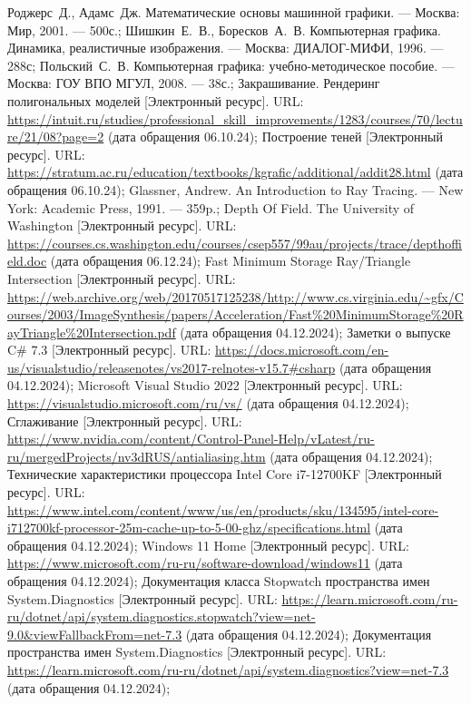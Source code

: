 \begin{thebibliography}{}
	 Роджерс~Д., Адамс~Дж. Математические основы машинной графики. --- Москва: Мир, 2001. --- 500с.;
	 Шишкин~Е.~В., Боресков~А.~В. Компьютерная графика. Динамика, реалистичные изображения. --- Москва: ДИАЛОГ-МИФИ, 1996. --- 288с;
	 Польский~С.~В. Компьютерная графика: учебно-методическое пособие. --- Москва: ГОУ ВПО МГУЛ, 2008. --- 38с.;
	 Закрашивание. Рендеринг полигональных моделей [Электронный ресурс]. URL: \url{https://intuit.ru/studies/professional\_skill\_improvements/1283/courses/70/lecture/21/08?page=2} (дата обращения 06.10.24);
	 Построение теней [Электронный ресурс]. URL: \url{https://stratum.ac.ru/education/textbooks/kgrafic/additional/addit28.html} (дата обращения 06.10.24);
	 Glassner, Andrew. An Introduction to Ray Tracing. --- New York: Academic Press, 1991. --- 359p.;
	 Depth Of Field. The University of Washington [Электронный ресурс]. URL: \url{https://courses.cs.washington.edu/courses/csep557/99au/projects/trace/depthoffield.doc} (дата обращения 06.12.24);
	 Fast Minimum Storage Ray/Triangle Intersection [Электронный ресурс]. URL: \url{https://web.archive.org/web/20170517125238/http://www.cs.virginia.edu/~gfx/Courses/2003/ImageSynthesis/papers/Acceleration/Fast\%20MinimumStorage\%20RayTriangle\%20Intersection.pdf} (дата обращения 04.12.2024);
	 Заметки о выпуске C\# 7.3 [Электронный ресурс]. URL: \url{https://docs.microsoft.com/en-us/visualstudio/releasenotes/vs2017-relnotes-v15.7#csharp} (дата обращения 04.12.2024);
	 Microsoft Visual Studio 2022 [Электронный ресурс]. URL: \url{https://visualstudio.microsoft.com/ru/vs/} (дата обращения 04.12.2024);
	 Сглаживание [Электронный ресурс]. URL: \url{https://www.nvidia.com/content/Control-Panel-Help/vLatest/ru-ru/mergedProjects/nv3dRUS/antialiasing.htm} (дата обращения 04.12.2024);
	 Технические характеристики процессора Intel Core i7-12700KF [Электронный ресурс]. URL: \url{https://www.intel.com/content/www/us/en/products/sku/134595/intel-core-i712700kf-processor-25m-cache-up-to-5-00-ghz/specifications.html} (дата обращения 04.12.2024);
	 Windows 11 Home [Электронный ресурс]. URL: \url{https://www.microsoft.com/ru-ru/software-download/windows11} (дата обращения 04.12.2024);
	 Документация класса Stopwatch пространства имен System.Diagnostics [Электронный ресурс]. URL: \url{https://learn.microsoft.com/ru-ru/dotnet/api/system.diagnostics.stopwatch?view=net-9.0&viewFallbackFrom=net-7.3} (дата обращения 04.12.2024);
	 Документация пространства имен System.Diagnostics [Электронный ресурс]. URL: \url{https://learn.microsoft.com/ru-ru/dotnet/api/system.diagnostics?view=net-7.3} (дата обращения 04.12.2024);
\end{thebibliography}
